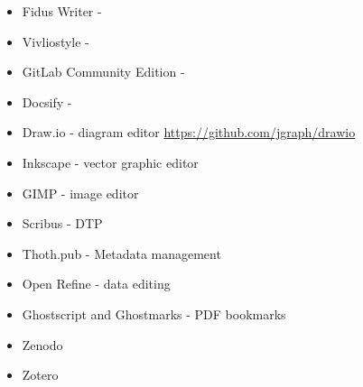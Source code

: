 \documentclass{article}
\begin{document}
\begin{itemize}
\item Fidus Writer - 


\item Vivliostyle - 


\item GitLab Community Edition - 


\item Docsify - 


\item Draw.io - diagram editor \href{https://github.com/jgraph/drawio}{https://github.com/jgraph/drawio}


\item Inkscape - vector graphic editor


\item GIMP - image editor


\item Scribus - DTP


\item Thoth.pub - Metadata management 


\item Open Refine - data editing


\item Ghostscript and Ghostmarks - PDF bookmarks 


\item Zenodo


\item Zotero


\end{itemize}
\end{document}
